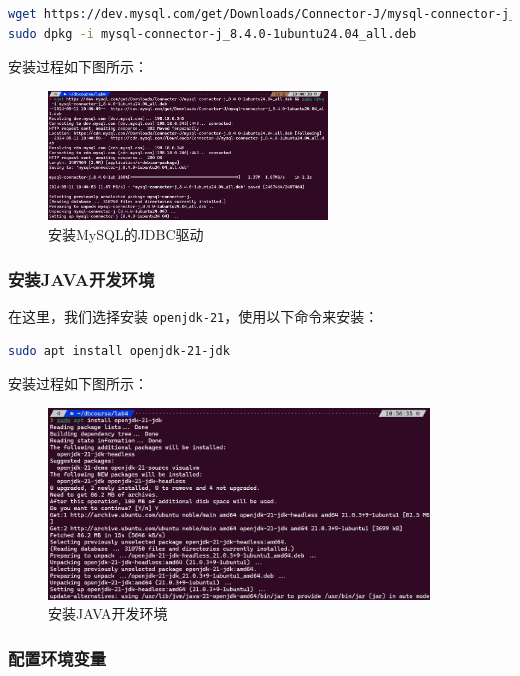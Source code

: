 \documentclass{article}
\begin{document}
\begin{lstlisting}[language=bash]
wget https://dev.mysql.com/get/Downloads/Connector-J/mysql-connector-j_8.4.0-1ubuntu24.04_all.deb
sudo dpkg -i mysql-connector-j_8.4.0-1ubuntu24.04_all.deb
\end{lstlisting}

安装过程如下图所示：

\begin{figure}[H]
  \centering
  \includegraphics[width=0.66\textwidth]{img/1.png}
  \caption{安装MySQL的JDBC驱动}
\end{figure}

\subsubsection{安装JAVA开发环境}

在这里，我们选择安装 \texttt{openjdk-21}，使用以下命令来安装：

\begin{lstlisting}[language=bash]
sudo apt install openjdk-21-jdk
\end{lstlisting}

安装过程如下图所示：

\begin{figure}[H]
  \centering
  \includegraphics[width=0.9\textwidth]{img/2.png}
  \caption{安装JAVA开发环境}
\end{figure}

\subsubsection{配置环境变量}
\end{document}
